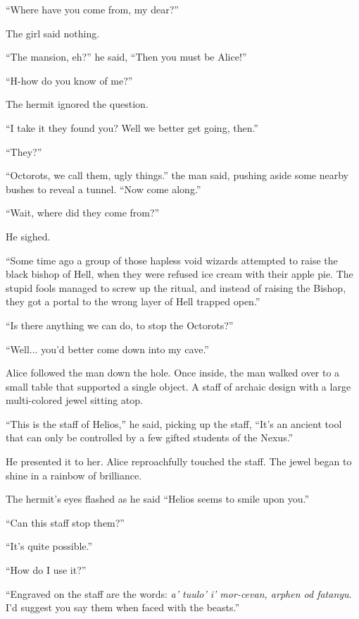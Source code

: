 ``Where have you come from, my dear?''
\VV


\noindent
The girl said nothing.
\VV


``The mansion, eh?'' he said, ``Then you must be Alice!''


``H-how do you know of me?''
\VV


\noindent
The hermit ignored the question.
\VV


``I take it they found you? Well we better get going, then.''


``They?''

``Octorots, we call them, ugly things.'' the man said,
pushing aside some nearby bushes to reveal a tunnel. ``Now come along.''


``Wait, where did they come from?''
\VV

\noindent
He sighed.
\VV


``Some time ago a group of those hapless void wizards attempted to raise the black bishop of Hell, when they were refused ice cream with their apple pie. The stupid fools managed to screw up the ritual, and instead of raising the Bishop, they got a portal to the wrong layer of Hell trapped open.''


``Is there anything we can do, to stop the Octorots?''


``Well... you'd better come down into my cave.''
\VV

\noindent
Alice followed the man down the hole.
Once inside, the man walked over to a small table that supported a single object.
A staff of archaic design with a large multi-colored jewel sitting atop.
\VV


``This is the staff of Helios,'' he said, picking up the staff, ``It's an ancient tool that can only be controlled by a few gifted students of the Nexus.''
\VV


\noindent
He presented it to her.
Alice reproachfully touched the staff. The jewel began to shine in a rainbow of brilliance.
\VV

The hermit's eyes flashed as he said ``Helios seems to smile upon you.''


``Can this staff stop them?''


``It's quite possible.''


``How do I use it?''


``Engraved on the staff are the words: \textit{a' tuulo' i' mor-cevan, arphen od fatanyu}. I'd suggest you say them when faced with the beasts.''
\VV

